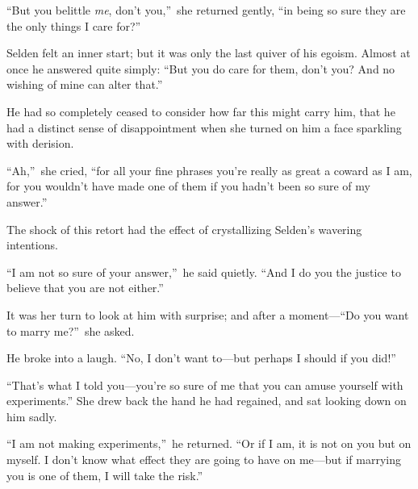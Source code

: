 \documentclass[12pt,a4paper]{book}
\begin{document}
``But you belittle \textit{me}, don't you,''\ she returned gently, ``in being
so sure they are the only things I care for?''





Selden felt an inner start; but it was only the last quiver of
his egoism. Almost at once he answered quite simply: ``But you do
care for them, don't you? And no wishing of mine can alter that.''





He had so completely ceased to consider how far this might carry
him, that he had a distinct sense of disappointment when she
turned on him a face sparkling with derision.





``Ah,''\ she cried, ``for all your fine phrases you're really as
great a coward as I am, for you wouldn't have made one of them if
you hadn't been so sure of my answer.''





The shock of this retort had the effect of crystallizing Selden's
wavering intentions.





``I am not so sure of your answer,''\ he said quietly. ``And I do you
the justice to believe that you are not either.''





It was her turn to look at him with surprise; and after a
moment---``Do you want to marry me?''\ she asked.





He broke into a laugh. ``No, I don't want to---but perhaps I should
if you did!''





``That's what I told you---you're so sure of me that you can amuse
yourself with experiments.'' She drew back the hand he had
regained, and sat looking down on him sadly.





``I am not making experiments,''\ he returned. ``Or if I am, it is
not on you but on myself. I don't know what effect they are going
to have on me---but if marrying you is one of them, I will take
the risk.''
\end{document}
